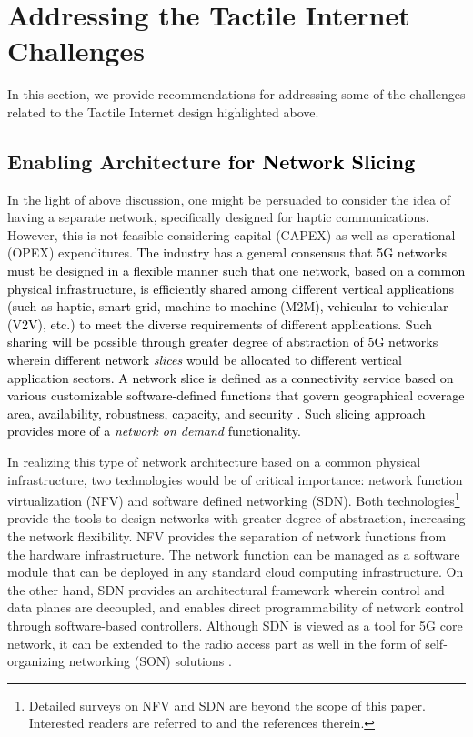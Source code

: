 \documentclass[journal]{IEEEtran}
\begin{document}
\section{Addressing the Tactile Internet Challenges}
In this section, we provide recommendations for addressing some of the challenges related to the Tactile Internet design highlighted above.



\subsection{Enabling Architecture \textcolor{black}{for Network Slicing}}

In the light of above discussion, one might be persuaded to consider the idea of having a separate network, specifically designed for haptic communications. However, this is not feasible considering capital (CAPEX) as well as operational (OPEX) expenditures. \textcolor{black}{The industry has a general consensus that 5G networks must be designed in a flexible manner such that one network, based on a common physical infrastructure, is efficiently shared among different vertical applications (such as haptic, smart grid, machine-to-machine (M2M), vehicular-to-vehicular (V2V), etc.) to meet the diverse requirements of different applications. Such sharing will be possible through greater degree of abstraction of 5G networks wherein different network \emph{slices} would be allocated to different vertical application sectors. A network slice is defined as a connectivity service based on various customizable software-defined functions that govern geographical coverage area, availability, robustness, capacity, and security \cite{eric_wp}. Such slicing approach provides more of a \emph{network on demand} functionality.}




In realizing this type of network architecture based on a common physical infrastructure, two technologies would be of critical importance: network function virtualization (NFV) and software defined networking (SDN). Both technologies\footnote{Detailed surveys on NFV and SDN are beyond the scope of this paper. Interested readers are referred to \cite{NFV,SDN} and the references therein. } provide the tools to design networks with greater degree of abstraction, increasing the network flexibility.  NFV provides the separation of network functions from the hardware infrastructure. The network function can be managed as a software module that can be deployed in any standard cloud computing infrastructure. On the other hand, SDN provides an architectural framework wherein control and data planes are decoupled, and enables direct programmability of network control through software-based controllers.   Although SDN is viewed as a tool for 5G core network, it can be extended to the radio access part as well in the form of self-organizing networking (SON) solutions \cite{SDN_cellular}.
\end{document}
